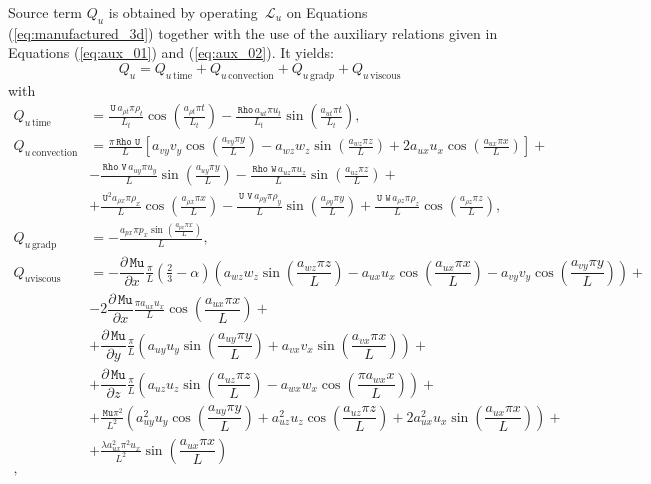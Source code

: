 \documentclass[10pt]{article}
\newcommand{\diff}[2] {\dfrac{\partial #1}{\partial #2}}
\newcommand{\Rho}{\,\mathtt{Rho}}
\newcommand{\U}{\,\mathtt{U}}
\newcommand{\V}{\,\mathtt{V}}
\newcommand{\W}{\,\mathtt{W}}
\newcommand{\Lo}{\,\mathcal{L}}
\newcommand{\Mu}{\,\mathtt{Mu}}
\newcommand{\DMuDx}{\diff{\Mu}{x}}
\newcommand{\DMuDy}{\diff{\Mu}{y}}
\newcommand{\DMuDz}{\diff{\Mu}{z}}
\newcommand{\convection}{\text{convection}}
\newcommand{\gradp}{\text{grad}p}
\newcommand{\viscous}{\text{viscous}}
\begin{document}
Source term $Q_u$ is obtained by operating $\Lo_{u}$ on Equations  (\ref{eq:manufactured_3d}) together with the use of the  auxiliary relations given in Equations (\ref{eq:aux_01}) and (\ref{eq:aux_02}). It yields:
\begin{equation*}
 \label{eq:ns1d_12}
Q_u = Q_{u \, \text{time}}+Q_{u \, \convection}+Q_{u \, \gradp }+Q_{u \, \viscous }
\end{equation*}
with
\begin{equation*}
 \begin{split}
 Q_{u \, \text{time}}&= 
\frac{ \U \, a_{\rho t} \pi\rho_{t} }{L_t}\cos\left(\frac{a_{\rho t} \pi t}{L_t}\right) - \frac{\Rho \, a_{ut} \pi u_{t} }{L_t}\sin\left(\frac{a_{ut} \pi t}{L_t}\right),\\
%
 Q_{u \, \text{convection}}&= 
\frac{\pi \Rho \, \U \, }{L} \left[a_{vy} v_{y}\cos\left(\frac{a_{vy} \pi y}{L}\right) - a_{wz} w_{z} \sin\left(\frac{a_{wz} \pi z}{L}\right) + 2 a_{ux} u_{x} \cos\left(\frac{a_{ux} \pi x}{L}\right)\right] + \\ 
&- \frac{ \Rho \, \V \, a_{uy} \pi u_{y} }{L}\sin\left(\frac{a_{uy} \pi y}{L}\right) - \frac{\Rho \, \W \, a_{uz} \pi u_{z} }{L} \sin\left(\frac{a_{uz} \pi z}{L}\right)+\\
&+ \frac{\U^{2} a_{\rho x} \pi \rho_{x} }{L}\cos\left(\frac{a_{\rho x} \pi x}{L}\right) - \frac{ \U \, \V \, a_{\rho y} \pi\rho_{y} }{L}\sin\left(\frac{a_{\rho y} \pi y}{L}\right)+ \frac{ \U \, \W \, a_{\rho z} \pi\rho_{z} }{L}\cos\left(\frac{a_{\rho z} \pi z}{L}\right) ,\\
%
Q_{u \, \text{gradp}}&= - \frac{a_{px} \pi p_{x} \sin\left(\frac{a_{px} \pi x}{L}\right)}{L}, \\
 Q_{u \viscous}&=
%
- \DMuDx \frac{\pi }{L} \left(\frac{2}{3} - \alpha\right) \left(a_{wz} w_{z} \sin\left(\dfrac{a_{wz} \pi z}{L}\right) - a_{ux} u_{x} \cos\left(\dfrac{a_{ux} \pi x}{L}\right) -a_{vy} v_{y} \cos\left(\dfrac{a_{vy} \pi y}{L}\right)\right) +\\
%
&- 2 \DMuDx \frac{\pi  a_{ux} u_{x}}{L}\cos\left(\dfrac{a_{ux} \pi x}{L}\right)+\\
%
&+\DMuDy \frac{\pi  }{L} \left(a_{uy} u_{y} \sin\left(\dfrac{a_{uy} \pi y}{L}\right) + a_{vx} v_{x}
\sin\left(\dfrac{a_{vx} \pi x}{L}\right)\right)+\\
%
&+ \DMuDz \frac{\pi  }{L}\left(a_{uz} u_{z}
\sin\left(\dfrac{a_{uz} \pi z}{L}\right) - a_{wx} w_{x} \cos\left(\dfrac{\pi a_{wx}
x}{L}\right)\right) +\\
%
&+ \frac{\Mu \pi^{2} }{L^{2}}\left(a_{uy}^{2} u_{y} \cos\left(\dfrac{a_{uy} \pi y}{L}\right) + a_{uz}^{2} u_{z} \cos\left(\dfrac{a_{uz} \pi z}{L}\right) + 2 a_{ux}^{2} u_{x} \sin\left(\dfrac{a_{ux} \pi x}{L}\right)\right) +\\
%
&+ \frac{\lambda a_{ux}^{2}\pi^{2} u_{x} }{L^{2}} \sin\left(\dfrac{a_{ux} \pi x}{L}\right)\\,
 \end{split}
\end{equation*}
\end{document}
